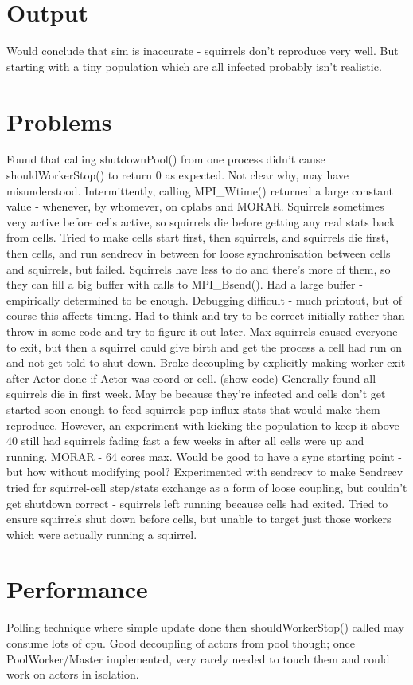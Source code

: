 \documentclass[11pt, oneside]{article}   %
\begin{document}
\section{Output}
Would conclude that sim is inaccurate - squirrels don't reproduce very well.
But starting with a tiny population which are all infected probably isn't realistic.

\section{Problems}
Found that calling shutdownPool() from one process didn't cause shouldWorkerStop() to return 0 as expected.
Not clear why, may have misunderstood.
Intermittently, calling MPI\_Wtime() returned a large constant value - whenever, by whomever, on cplabs and MORAR.
Squirrels sometimes very active before cells active, so squirrels die before getting any real stats back from cells.
Tried to make cells start first, then squirrels, and squirrels die first, then cells, and run sendrecv in between for loose synchronisation between cells and squirrels, but failed.
Squirrels have less to do and there's more of them, so they can fill a big buffer with calls to MPI\_Bsend().
Had a large buffer - empirically determined to be enough.
Debugging difficult - much printout, but of course this affects timing.
Had to think and try to be correct initially rather than throw in some code and try to figure it out later.
Max squirrels caused everyone to exit, but then a squirrel could give birth and get the process a cell had run on and not get told to shut down.
Broke decoupling by explicitly making worker exit after Actor done if Actor was coord or cell. (show code)
Generally found all squirrels die in first week.  May be because they're infected and cells don't get started soon enough to feed squirrels pop influx stats that would make them reproduce.
However, an experiment with kicking the population to keep it above 40 still had squirrels fading fast a few weeks in after all cells were up and running.
MORAR - 64 cores max.
Would be good to have a sync starting point - but how without modifying pool?
Experimented with sendrecv to make 
Sendrecv tried for squirrel-cell step/stats exchange as a form of loose coupling, but couldn't get shutdown correct - squirrels left running because cells had exited.
Tried to ensure squirrels shut down before cells, but unable to target just those workers which were actually running a squirrel.

\section{Performance}
Polling technique where simple update done then shouldWorkerStop() called may consume lots of cpu.
Good decoupling of actors from pool though; once PoolWorker/Master implemented, very rarely needed to touch them and could work on actors in isolation.
\end{document}
